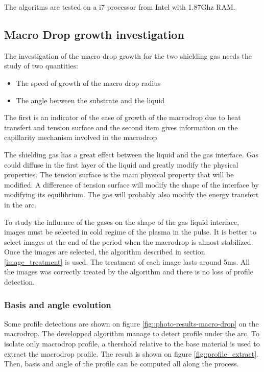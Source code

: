 \documentclass[12pt]{iopart}
\begin{document}
The algoritms are tested on a i7 processor from Intel with 1.87Ghz RAM.


\subsection{ Macro Drop growth investigation}
\label{macro_drop_growth_investigation}

The investigation of the macro drop growth for the two shielding gas needs the study of two quantities:

\begin{itemize}
\item The speed of growth of the macro drop radius
\item The angle between the substrate and the liquid
\end{itemize}

The first is an indicator of the ease of growth of the macrodrop due to
heat transfert and tension surface and the second  item gives information
 on the capillarity mechanism involved in the macrodrop


The shielding gas has a great effect between the liquid and the gas interface. Gas could diffuse in the
first layer of the liquid and greatly modify the physical properties. The tension surface is the main physical
property that will be modified. A difference of tension surface will modify the shape of the interface by modifying
its equilibrium. The gas will probably also modify the energy transfert in the arc.

 To study the influence of the gases on the shape of the gas liquid interface, images must be selected in cold
regime of the plasma in the pulse. It is better to select images at the end of the period when the macrodrop is
almost stabilized. Once the images are selected, the algorithm described in section \ref{image_treatment} is used.
The treatment of each image lasts around 5ms. All the images was correctly treated by the algorithm and there is no loss
of profile detection.

\subsubsection{Basis and angle evolution} 
\label{basis_and_angle_evolution}
Some profile detections are shown on figure \ref{fig::photo-results-macro-drop} on the macrodrop.
 The developped algorithm manage to detect profile under the arc.
 To isolate only macrodrop profile, a thershold relative to the base material is used to extract the macrodrop profile.
The result is shown on figure \ref{fig::profile_extract}. Then, basis and angle of the profile can be computed
all along  the process.
\end{document}
